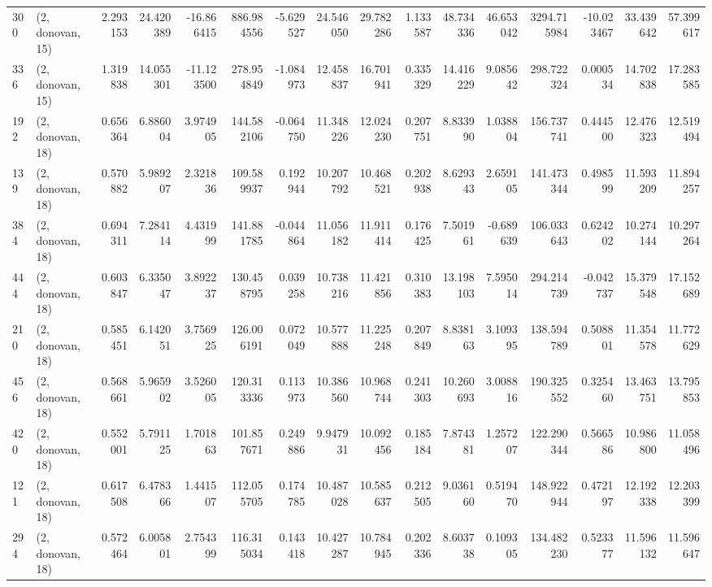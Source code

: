\begin{tabular}{llrrrrrrrrrrrrrr}
300 &  (2, donovan, 15) &   2.293153 &  24.420389 & -16.866415 &   886.984556 &  -5.629527 &  24.546050 &  29.782286 &  1.133587 &  48.734336 &  46.653042 &   3294.715984 & -10.023467 &  33.439642 &   57.399617 \\
336 &  (2, donovan, 15) &   1.319838 &  14.055301 & -11.123500 &   278.954849 &  -1.084973 &  12.458837 &  16.701941 &  0.335329 &  14.416229 &   9.085642 &    298.722324 &   0.000534 &  14.702838 &   17.283585 \\
192 &  (2, donovan, 18) &   0.656364 &   6.886004 &   3.974905 &   144.582106 &  -0.064750 &  11.348226 &  12.024230 &  0.207751 &   8.833990 &   1.038804 &    156.737741 &   0.444500 &  12.476323 &   12.519494 \\
139 &  (2, donovan, 18) &   0.570882 &   5.989207 &   2.321836 &   109.589937 &   0.192944 &  10.207792 &  10.468521 &  0.202938 &   8.629343 &   2.659105 &    141.473344 &   0.498599 &  11.593209 &   11.894257 \\
384 &  (2, donovan, 18) &   0.694311 &   7.284114 &   4.431999 &   141.881785 &  -0.044864 &  11.056182 &  11.911414 &  0.176425 &   7.501961 &  -0.689639 &    106.033643 &   0.624202 &  10.274144 &   10.297264 \\
444 &  (2, donovan, 18) &   0.603847 &   6.335047 &   3.892237 &   130.458795 &   0.039258 &  10.738216 &  11.421856 &  0.310383 &  13.198103 &   7.595014 &    294.214739 &  -0.042737 &  15.379548 &   17.152689 \\
210 &  (2, donovan, 18) &   0.585451 &   6.142051 &   3.756925 &   126.006191 &   0.072049 &  10.577888 &  11.225248 &  0.207849 &   8.838163 &   3.109395 &    138.594789 &   0.508801 &  11.354578 &   11.772629 \\
456 &  (2, donovan, 18) &   0.568661 &   5.965902 &   3.526005 &   120.313336 &   0.113973 &  10.386560 &  10.968744 &  0.241303 &  10.260693 &   3.008816 &    190.325552 &   0.325460 &  13.463751 &   13.795853 \\
420 &  (2, donovan, 18) &   0.552001 &   5.791125 &   1.701863 &   101.857671 &   0.249886 &   9.947931 &  10.092456 &  0.185184 &   7.874381 &   1.257207 &    122.290344 &   0.566586 &  10.986800 &   11.058496 \\
121 &  (2, donovan, 18) &   0.617508 &   6.478366 &   1.441507 &   112.055705 &   0.174785 &  10.487028 &  10.585637 &  0.212505 &   9.036160 &   0.519470 &    148.922944 &   0.472197 &  12.192338 &   12.203399 \\
294 &  (2, donovan, 18) &   0.572464 &   6.005801 &   2.754399 &   116.315034 &   0.143418 &  10.427287 &  10.784945 &  0.202336 &   8.603738 &   0.109305 &    134.482230 &   0.523377 &  11.596132 &   11.596647 \\

\end{tabular}
